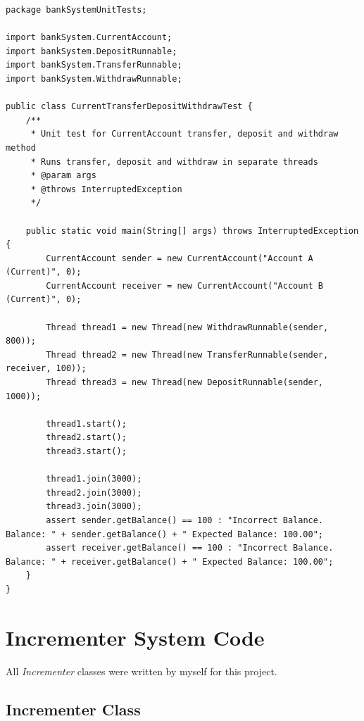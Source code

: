 \documentclass[a4paper,12pt]{article}
\begin{document}
\begin{lstlisting}
package bankSystemUnitTests;

import bankSystem.CurrentAccount;
import bankSystem.DepositRunnable;
import bankSystem.TransferRunnable;
import bankSystem.WithdrawRunnable;

public class CurrentTransferDepositWithdrawTest {
    /**
     * Unit test for CurrentAccount transfer, deposit and withdraw method
     * Runs transfer, deposit and withdraw in separate threads
     * @param args
     * @throws InterruptedException
     */

    public static void main(String[] args) throws InterruptedException {
        CurrentAccount sender = new CurrentAccount("Account A (Current)", 0);
        CurrentAccount receiver = new CurrentAccount("Account B (Current)", 0);

        Thread thread1 = new Thread(new WithdrawRunnable(sender, 800));
        Thread thread2 = new Thread(new TransferRunnable(sender, receiver, 100));
        Thread thread3 = new Thread(new DepositRunnable(sender, 1000));

        thread1.start();
        thread2.start();
        thread3.start();

        thread1.join(3000);
        thread2.join(3000);
        thread3.join(3000);
        assert sender.getBalance() == 100 : "Incorrect Balance. Balance: " + sender.getBalance() + " Expected Balance: 100.00";
        assert receiver.getBalance() == 100 : "Incorrect Balance. Balance: " + receiver.getBalance() + " Expected Balance: 100.00";
    }
}
\end{lstlisting}

\section{Incrementer System Code} \label{appendix:Incrementer System}

All \textit{Incrementer} classes were written by myself for this project.

\subsection{Incrementer Class} \label{appendix:Incrementer}
\end{document}

